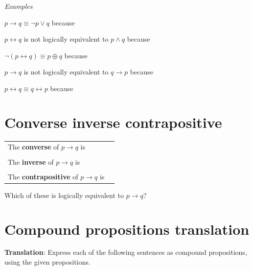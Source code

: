 \documentclass[12pt, oneside]{article}
\begin{document}
    {\it Examples} 
    
    $p \to q \equiv \lnot p \lor q$ because \underline{\phantom{\hspace{4in}}} 
    
    \vfill
    
    $p \leftrightarrow q$ is not logically equivalent to $p \land q$ because \underline{\phantom{\hspace{4in}}} 
    
    \vfill
    
    $\lnot( p \leftrightarrow q) \equiv p \oplus q$ because \underline{\phantom{\hspace{4in}}} 
    
    \vfill
    
    
    $p \to q$ is not logically equivalent to $q \to p$ because \underline{\phantom{\hspace{4in}}} 
    
    \vfill
    
    $p \leftrightarrow q \equiv q \leftrightarrow p$ because \underline{\phantom{\hspace{4in}}} 
    
    \vfill \vfill
\section*{Converse inverse contrapositive}


\begin{tabular}{ll}
    The {\bf  converse}  of $p \to q$ is & \underline{\phantom{\hspace{1.6in}}}\\
    &  \\
    The {\bf  inverse}  of $p \to q$ is  &\underline{\phantom{\hspace{1.6in}}}\\
    &  \\
    The {\bf  contrapositive}  of $p \to q$ is & \underline{\phantom{\hspace{1.6in}}}
    \end{tabular}
    Which of these is logically equivalent to $p \to q$?
    
    \vfill
    \vfill \vfill
\section*{Compound propositions translation}


{\bf Translation}: Express each of the following sentences as compound propositions, using
the given propositions.
\end{document}
